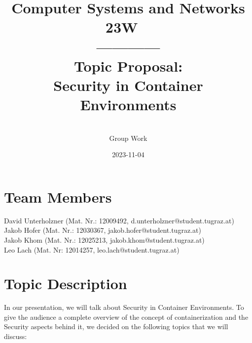 \documentclass{article}
\begin{document}
\title{
Computer Systems and Networks \\ 23W \
         \\ ------------ \\ Topic Proposal: \\ Security in Container Environments \\
}
\date{2023-11-04}
\author{\\Group Work}
\maketitle{}
\bigskip

\renewcommand{\baselinestretch}{0.7}\normalsize
\tableofcontents{}
\renewcommand{\baselinestretch}{1.0}\normalsize

\newpage




\section{Team Members}
David Unterholzner (Mat. Nr.: 12009492, d.unterholzner@student.tugraz.at)\\
Jakob Hofer (Mat. Nr.: 12030367, jakob.hofer@student.tugraz.at)\\
Jakob Khom (Mat. Nr.: 12025213, jakob.khom@student.tugraz.at)\\
Leo Lach (Mat. Nr: 12014257, leo.lach@student.tugraz.at)\\

\bigskip
\section{Topic Description}
In our presentation, we will talk about Security in Container Environments. 
To give the audience a complete overview of the concept of containerization and 
the Security aspects behind it, we decided on the following topics that we will discuss:
\end{document}
